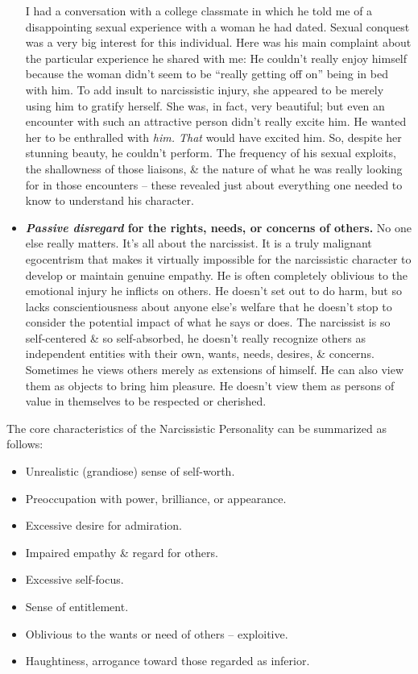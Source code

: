 \documentclass{article}
\numberwithin{equation}{section}
\begin{document}
\begin{itemize}
	I had a conversation with a college classmate in which he told me of a disappointing sexual experience with a woman he had dated. Sexual conquest was a very big interest for this individual. Here was his main complaint about the particular experience he shared with me: He couldn't really enjoy himself because the woman didn't seem to be ``really getting off on'' being in bed with him. To add insult to narcissistic injury, she appeared to be merely using him to gratify herself. She was, in fact, very beautiful; but even an encounter with such an attractive person didn't really excite him. He wanted her to be enthralled with \textit{him. That} would have excited him. So, despite her stunning beauty, he couldn't perform. The frequency of his sexual exploits, the shallowness of those liaisons, \& the nature of what he was really looking for in those encounters -- these revealed just about everything one needed to know to understand his character.
	\item \textbf{\textit{Passive disregard} for the rights, needs, or concerns of others.} No one else really matters. It's all about the narcissist. It is a truly malignant egocentrism that makes it virtually impossible for the narcissistic character to develop or maintain genuine empathy. He is often completely oblivious to the emotional injury he inflicts on others. He doesn't set out to do harm, but so lacks conscientiousness about anyone else's welfare that he doesn't stop to consider the potential impact of what he says or does. The narcissist is so self-centered \& so self-absorbed, he doesn't really recognize others as independent entities with their own, wants, needs, desires, \& concerns. Sometimes he views others merely as extensions of himself. He can also view them as objects to bring him pleasure. He doesn't view them as persons of value in themselves to be respected or cherished.
\end{itemize}
The core characteristics of the Narcissistic Personality can be summarized as follows:
\begin{itemize}
	\item Unrealistic (grandiose) sense of self-worth.
	\item Preoccupation with power, brilliance, or appearance.
	\item Excessive desire for admiration.
	\item Impaired empathy \& regard for others.
	\item Excessive self-focus.
	\item Sense of entitlement.
	\item Oblivious to the wants or need of others -- exploitive.
	\item Haughtiness, arrogance toward those regarded as inferior.	
\end{itemize}
\end{document}
